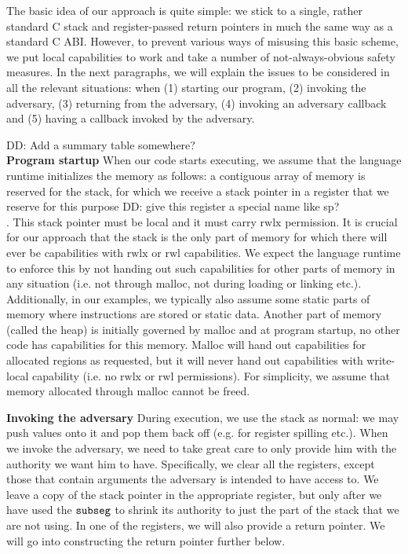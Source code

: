\documentclass[compsoc,conference,letterpaper,fleqn]{IEEEtran}
\newcommand\dominique[1]{{\color{purple} \sf \footnotesize {DD: #1}}\\}
\newcommand{\zinstr}[1]{\mathtt{#1}}
\newcommand{\threeinstr}[4]{
  \ifthenelse{\equal{#2#3#4}{}}
  {\zinstr{#1}}
  {\zinstr{#1} \; #2 \; #3 \; #4}
}
\newcommand{\subseg}[3]{\threeinstr{subseg}{#1}{#2}{#3}}
\newcommand{\plainperm}[1]{\mathrm{#1}}
\newcommand{\readwritel}{\plainperm{rwl}}
\newcommand{\rwl}{\readwritel}
\newcommand{\rwlx}{\plainperm{rwlx}}
\begin{document}
The basic idea of our approach is quite simple: we stick to a single, rather
standard C stack and register-passed return pointers in much the same way as a
standard C ABI. However, to prevent various ways of misusing this basic scheme,
we put local capabilities to work and take a number of not-always-obvious safety
measures. In the next paragraphs, we will explain the issues to be considered in
all the relevant situations: when (1) starting our program, (2) invoking the
adversary, (3) returning from the adversary, (4) invoking an adversary callback
and (5) having a callback invoked by the adversary.

\dominique{Add a summary table somewhere?}

\textbf{Program startup}
When our code starts executing, we assume that the language runtime initializes
the memory as follows: a contiguous array of memory is reserved for the stack,
for which we receive a stack pointer in a register that we reserve for this
purpose \dominique{give this register a special name like sp?}. This stack
pointer must be local and it must carry $\rwlx$ permission. It is crucial for
our approach that the stack is the only part of memory for which there will ever
be capabilities with $\rwlx$ or $\rwl$ capabilities. We expect the language
runtime to enforce this by not handing out such capabilities for other parts of
memory in any situation (i.e. not through malloc, not during loading or linking
etc.). Additionally, in our examples, we typically also assume some static parts
of memory where instructions are stored or static data. Another part of memory
(called the heap) is initially governed by malloc and at program startup, no
other code has capabilities for this memory. Malloc will hand out capabilities
for allocated regions as requested, but it will never hand out capabilities with
write-local capability (i.e. no $\rwlx$ or $\rwl$ permissions). For simplicity,
we assume that memory allocated through malloc cannot be freed.

\textbf{Invoking the adversary}
During execution, we use the stack as normal: we may push values onto it and pop
them back off (e.g. for register spilling etc.). When we invoke the adversary,
we need to take great care to only provide him with the authority we want him to
have. Specifically, we clear all the registers, except those that contain
arguments the adversary is intended to have access to. We leave a copy of the
stack pointer in the appropriate register, but only after we have used the
$\subseg{}{}{}$ to shrink its authority to just the part of the stack that we
are not using. In one of the registers, we will also provide a return pointer.
We will go into constructing the return pointer further below.
\end{document}
